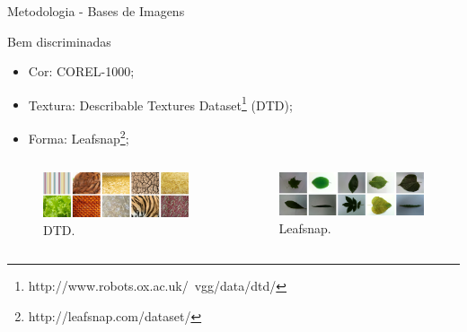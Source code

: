 \documentclass{beamer}
\begin{document}
\begin{frame}{Metodologia - Bases de Imagens}
\setlength\leftmargini{1em}
\begin{block}{Bem discriminadas}
\justifying
\begin{itemize}
\item Cor: COREL-1000;
\item Textura: Describable Textures Dataset\footnote{http://www.robots.ox.ac.uk/~vgg/data/dtd/} (DTD);
\item Forma: Leafsnap\footnote{http://leafsnap.com/dataset/};
\end{itemize}
\end{block}
\vspace{1em}
\begin{columns}
  \begin{column}{0.5\textwidth}
    \begin{figure}[hbpt]
      \begin{center}
        \includegraphics[width=\columnwidth]{figuras/texture.png}
      \end{center}
      \caption{DTD.}
    \end{figure}
    \end{column}
  \begin{column}{0.5\textwidth}
    \begin{figure}[hbpt]
      \begin{center}    
        \includegraphics[width=\columnwidth]{figuras/leafs.png}
       \end{center}
      \caption{Leafsnap.}
    \end{figure}
  \end{column}
\end{columns}
\end{frame}
\end{document}
